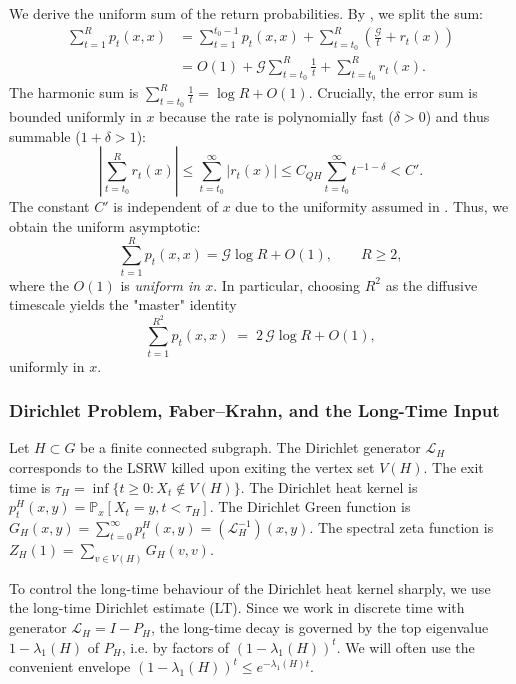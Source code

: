 \documentclass[reqno]{amsart}
\numberwithin{equation}{section}
\theoremstyle{definition}
\theoremstyle{remark}
\newcommand{\cG}{\mathcal{G}}
\newcommand{\LL}{\mathcal{L}}
\newcommand{\Prob}{\mathbb{P}}
\begin{document}
We derive the uniform sum of the return probabilities. By , we split the sum:
\begin{align*}
\sum_{t=1}^{R} p_t(x,x) &= \sum_{t=1}^{t_0-1} p_t(x,x) + \sum_{t=t_0}^{R} \left(\frac{\cG}{t} + r_t(x)\right) \\
&= O(1) + \cG \sum_{t=t_0}^{R} \frac{1}{t} + \sum_{t=t_0}^{R} r_t(x).
\end{align*}
The harmonic sum is $\sum_{t=t_0}^{R} \frac{1}{t} = \log R + O(1)$.
Crucially, the error sum is bounded uniformly in $x$ because the rate is polynomially fast ($\delta>0$) and thus summable ($1+\delta > 1$):
\[
\left|\sum_{t=t_0}^{R} r_t(x)\right| \leq \sum_{t=t_0}^{\infty} |r_t(x)| \leq C_{QH} \sum_{t=t_0}^{\infty} t^{-1-\delta} < C'.
\]
The constant $C'$ is independent of $x$ due to the uniformity assumed in .
Thus, we obtain the uniform asymptotic:
\begin{equation}\label{eq:return-sum}
\sum_{t=1}^{R} p_t(x,x) = \cG \log R + O(1), \qquad R \geq 2,
\end{equation}
where the $O(1)$ is \emph{uniform in $x$}. In particular, choosing $R^2$ as the diffusive timescale yields the "master" identity
\begin{equation}\label{eq:master-sum}
  \sum_{t=1}^{R^{2}} p_t(x,x)
  \;=\; 2\,\cG \log R + O(1),
\end{equation}
uniformly in $x$.



\subsubsection{Dirichlet Problem, Faber--Krahn, and the Long-Time Input}
Let $H \subset G$ be a finite connected subgraph.
The Dirichlet generator $\LL_H$ corresponds to the LSRW killed upon exiting the vertex set $V(H)$. The exit time is $\tau_H = \inf\{t \geq 0 : X_t \notin V(H)\}$.
The Dirichlet heat kernel is $p_t^H(x,y) = \Prob_x[X_t = y, t < \tau_H]$. The Dirichlet Green function is $G_H(x,y) = \sum_{t=0}^{\infty} p_t^H(x,y) = (\LL_H^{-1})(x,y)$. The spectral zeta function is $Z_H(1) = \sum_{v \in V(H)} G_H(v,v)$.

To control the long-time behaviour of the Dirichlet heat kernel sharply, we use the long-time Dirichlet estimate (LT). Since we work in discrete time with generator $\LL_H=I-P_H$, the long-time decay is governed by the top eigenvalue $1-\lambda_1(H)$ of $P_H$, i.e. by factors of $(1-\lambda_1(H))^t$. We will often use the convenient envelope $(1-\lambda_1(H))^t\le e^{-\lambda_1(H)t}$.
\end{document}
